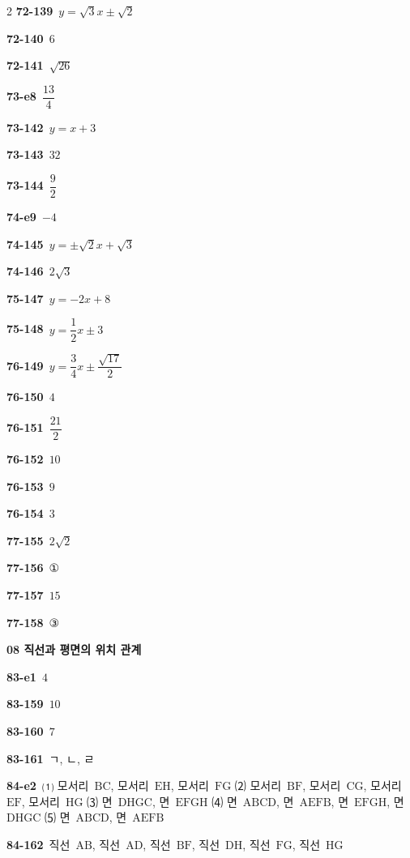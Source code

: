 \documentclass[10pt,a4paper]{article}
\newcommand{\pt}[1]{\mathrm{#1}}
\begin{document}
\begin{multicols}{2}
\noindent\textbf{72-139}\ $y=\sqrt{3}x\pm\sqrt{2}$\par
\noindent\textbf{72-140}\ $6$\par
\noindent\textbf{72-141}\ $\sqrt{26}$\par
\noindent\textbf{73-e8}\ $\dfrac{13}{4}$\par
\noindent\textbf{73-142}\ $y=x+3$\par
\noindent\textbf{73-143}\ $32$\par
\noindent\textbf{73-144}\ $\dfrac{9}{2}$\par
\noindent\textbf{74-e9}\ $-4$\par
\noindent\textbf{74-145}\ $y=\pm\sqrt{2}x+\sqrt{3}$\par
\noindent\textbf{74-146}\ $2\sqrt{3}$\par
\noindent\textbf{75-147}\ $y=-2x+8$\par
\noindent\textbf{75-148}\ $y=\dfrac{1}{2}x\pm3$\par
\noindent\textbf{76-149}\ $y=\dfrac{3}{4}x\pm\dfrac{\sqrt{17}}{2}$\par
\noindent\textbf{76-150}\ $4$\par
\noindent\textbf{76-151}\ $\dfrac{21}{2}$\par
\noindent\textbf{76-152}\ $10$\par
\noindent\textbf{76-153}\ $9$\par
\noindent\textbf{76-154}\ $3$\par
\noindent\textbf{77-155}\ $2\sqrt{2}$\par
\noindent\textbf{77-156}\ ①\par
\noindent\textbf{77-157}\ $15$\par
\noindent\textbf{77-158}\ ③\par
\noindent\textbf{08 직선과 평면의 위치 관계}\par\smallskip
\noindent\textbf{83-e1}\ $4$\par
\noindent\textbf{83-159}\ $10$\par
\noindent\textbf{83-160}\ $7$\par
\noindent\textbf{83-161}\ ㄱ, ㄴ, ㄹ\par
\noindent\textbf{84-e2}\ ⑴ 모서리~$\pt{BC}$, 모서리~$\pt{EH}$, 모서리~$\pt{FG}$ ⑵ 모서리~$\pt{BF}$, 모서리~$\pt{CG}$, 모서리~$\pt{EF}$, 모서리~$\pt{HG}$ ⑶ 면~$\pt{DHGC}$, 면~$\pt{EFGH}$ ⑷ 면~$\pt{ABCD}$, 면~$\pt{AEFB}$, 면~$\pt{EFGH}$, 면~$\pt{DHGC}$ ⑸ 면~$\pt{ABCD}$, 면~$\pt{AEFB}$\par
\noindent\textbf{84-162}\ 직선~$\pt{AB}$, 직선~$\pt{AD}$, 직선~$\pt{BF}$, 직선~$\pt{DH}$, 직선~$\pt{FG}$, 직선~$\pt{HG}$\par

\end{multicols}
\end{document}
